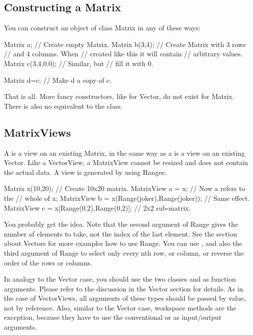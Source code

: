 \subsection{Constructing a Matrix}
You can construct an object of class Matrix in any of these ways:

\begin{code}
Matrix a;          // Create empty Matrix.
Matrix b(3,4);     // Create Matrix with 3 rows
                   // and 4 columns. When
                   // created like this it will contain
                   // arbitrary values.
Matrix c(3,4,0.0); // Similar, but
                   // fill it with 0.

Matrix d=c;        // Make d a copy of c.
\end{code}

That is all. More fancy constructors, like for Vector, do not exist
for Matrix. There is also no equivalent to the 
class.

\subsection{MatrixViews}

A  is a view on an existing Matrix, in the same way
as a  is a view on an existing Vector. Like a
VectorView, a MatrixView cannot be resized and does not contain the
actual data. A view is generated by using Ranges:

\begin{code}
Matrix x(10,20);                  // Create 10x20 matrix.
MatrixView a = x;                 // Now a refers to the
                                  // whole of x;
MatrixView b = x(Range(joker),Range(joker));
                                  // Same effect.
MatrixView c = x[Range(0,2),Range(0,2)];
                                  // 2x2 sub-matrix.
\end{code}

You probably get the idea. Note that the second argument of Range gives
the number of elements to take, not the index of the last element. See
the section about Vectors for more examples how to use Range. You can
use , and also the third argument of Range to select only
every nth row, or column, or reverse the order of the rows or columns.

In analogy to the Vector case, you should use the two classes
 and  as function arguments.
Please refer to the discussion in the Vector section for details. As
in the case of VectorViews, all arguments of these types should be
passed by value, not by reference. Also, similar to the Vector case,
workspace methods are the exception, because they have to use the
conventional  or  as input/output
arguments.

